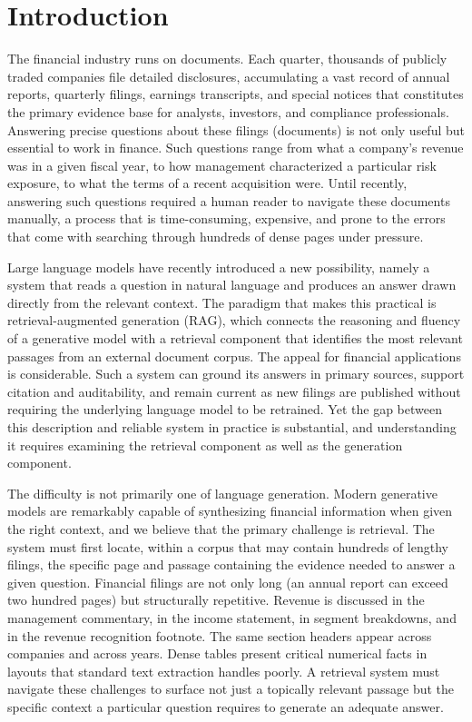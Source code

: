 \documentclass[12pt,twoside,maitrise]{dms}
\theoremstyle{definition}
\numberwithin{equation}{section}
\numberwithin{table}{chapter}
\numberwithin{figure}{chapter}
\begin{document}
\chapter*{Introduction}

The financial industry runs on documents. Each quarter, thousands of publicly traded
companies file detailed disclosures, accumulating a vast record of
annual reports, quarterly filings, earnings transcripts, and special notices that
constitutes the primary evidence base for analysts, investors, and compliance
professionals. Answering precise questions about these filings (documents) is not only useful but
essential to work in finance. Such questions range from what a company's
revenue was in a given fiscal year, to how management characterized a particular risk
exposure, to what the terms of a recent acquisition were. Until recently, answering such
questions required a human reader to navigate these documents manually, a process that is
time-consuming, expensive, and prone to the errors that come with searching through
hundreds of dense pages under pressure.

Large language models have recently introduced a new possibility, namely a system that
reads a question in natural language and produces an answer drawn directly from
the relevant context. The paradigm that makes this practical is retrieval-augmented
generation (RAG), which connects the reasoning and fluency of a generative model with a
retrieval component that identifies the most relevant passages from an external document
corpus. The appeal for financial applications is considerable. Such a system can ground
its answers in primary sources, support citation and auditability, and remain current as
new filings are published without requiring the underlying language model to be retrained.
Yet the gap between this description and reliable system in practice is
substantial, and understanding it requires examining the retrieval component as well as the generation component.

The difficulty is not primarily one of language generation. Modern generative models are
remarkably capable of synthesizing financial information when given the right context, and we believe that the primary challenge is retrieval. The system must first locate, within a corpus that may
contain hundreds of lengthy filings, the specific page and passage containing the
evidence needed to answer a given question. Financial filings are not only long (an
annual report can exceed two hundred pages) but structurally repetitive. Revenue is discussed
in the management commentary, in the income statement, in segment breakdowns, and in the
revenue recognition footnote. The same section headers appear across companies and across
years. Dense tables present critical numerical facts in layouts that standard text
extraction handles poorly. A retrieval system must navigate these challenges to surface
not just a topically relevant passage but the specific context a particular question
requires to generate an adequate answer.
\end{document}

